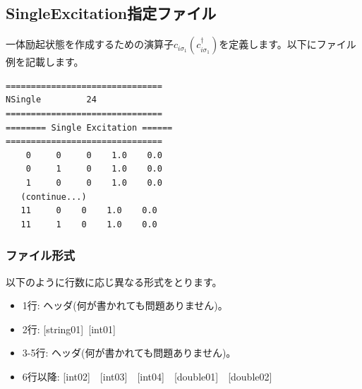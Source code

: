 \newpage
\subsection{{SingleExcitation指定ファイル}}
\label{Subsec:singleexcitation}
一体励起状態を作成するための演算子$c_{i\sigma_1}(c_{i\sigma_1}^{\dagger})$を定義します。以下にファイル例を記載します。

\begin{minipage}{12.5cm}
\begin{screen}
\begin{verbatim}
===============================
NSingle         24
===============================
======== Single Excitation ======
===============================
    0     0     0    1.0    0.0
    0     1     0    1.0    0.0
    1     0     0    1.0    0.0
   (continue...)
   11     0    0    1.0    0.0
   11     1    0    1.0    0.0
\end{verbatim}
\end{screen}
\end{minipage}

\subsubsection{ファイル形式}
以下のように行数に応じ異なる形式をとります。
 \begin{itemize}
   \item  1行:  ヘッダ(何が書かれても問題ありません)。
   \item  2行:   [string01]~[int01]
   \item  3-5行:  ヘッダ(何が書かれても問題ありません)。
   \item  6行以降: [int02]~~[int03]~~[int04]~~[double01]~~[double02]
  \end{itemize}
